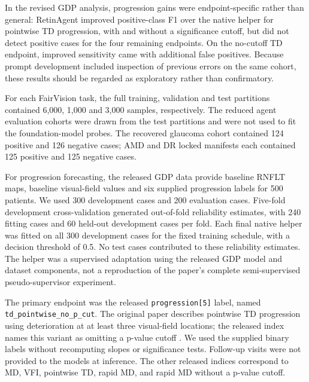In the revised GDP analysis, progression gains were endpoint-specific rather
than general: RetinAgent improved positive-class F1 over the native helper for
pointwise TD progression, with and without a significance cutoff, but did not
detect positive cases for the four remaining endpoints. On the no-cutoff TD
endpoint, improved sensitivity came with additional false positives. Because
prompt development included inspection of previous errors on the same cohort,
these results should be regarded as exploratory rather than confirmatory.

For each FairVision task, the full training, validation and test partitions
contained 6,000, 1,000 and 3,000 samples, respectively. The reduced agent
evaluation cohorts were drawn from the test partitions and were not used to
fit the foundation-model probes. The recovered glaucoma cohort contained
124 positive and 126 negative cases; AMD and DR locked manifests each
contained 125 positive and 125 negative cases.

For progression forecasting, the released GDP data provide baseline RNFLT
maps, baseline visual-field values and six supplied progression labels for
500 patients. We used 300 development cases and 200 evaluation cases.
Five-fold development cross-validation generated out-of-fold reliability
estimates, with 240 fitting cases and 60 held-out development cases per fold.
Each final native helper was fitted on all 300 development cases for the fixed
training schedule, with a decision threshold of 0.5. No test cases contributed
to these reliability estimates. The helper was a supervised adaptation using
the released GDP model and dataset components, not a reproduction of the
paper's complete semi-supervised pseudo-supervisor experiment.

The primary endpoint was the released \texttt{progression[5]} label, named
\texttt{td\_pointwise\_no\_p\_cut}. The original paper describes pointwise TD
progression using deterioration at at least three visual-field locations;
the released index names this variant as omitting a p-value cutoff
\cite{luo2023harvard}. We used the supplied binary labels without recomputing
slopes or significance tests. Follow-up visits were not provided to the models
at inference. The other released indices correspond to MD, VFI, pointwise TD,
rapid MD, and rapid MD without a p-value cutoff.

